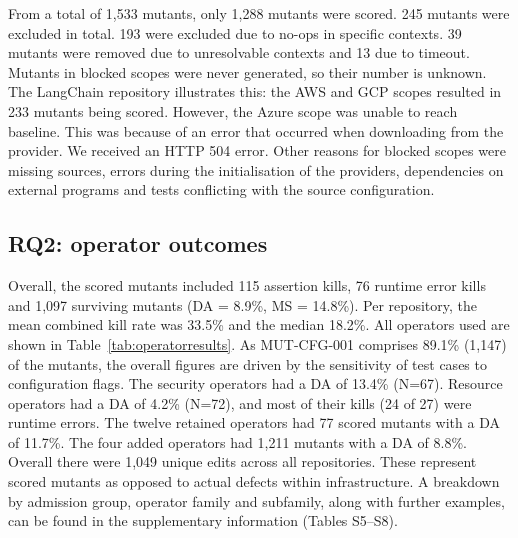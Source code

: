 \documentclass[3p,times,procedia]{elsarticle}
\begin{document}
From a total of 1,533 mutants, only 1,288 mutants were scored. 245 mutants were excluded in total. 193 were excluded due to no-ops in specific contexts. 39 mutants were removed due to unresolvable contexts and 13 due to timeout. Mutants in blocked scopes were never generated, so their number is unknown. The LangChain repository illustrates this: the AWS and GCP scopes resulted in 233 mutants being scored. However, the Azure scope was unable to reach baseline. This was because of an error that occurred when downloading from the provider. We received an HTTP 504 error. Other reasons for blocked scopes were missing sources, errors during the initialisation of the providers, dependencies on external programs and tests conflicting with the source configuration.

\subsection{RQ2: operator outcomes}\label{sec:operatorresults}
Overall, the scored mutants included 115 assertion kills, 76 runtime error kills and 1,097 surviving mutants (DA = 8.9\%, MS = 14.8\%). Per repository, the mean combined kill rate was 33.5\% and the median 18.2\%. All operators used are shown in Table~\ref{tab:operatorresults}. As MUT-CFG-001 comprises 89.1\% (1,147) of the mutants, the overall figures are driven by the sensitivity of test cases to configuration flags. The security operators had a DA of 13.4\% (N=67). Resource operators had a DA of 4.2\% (N=72), and most of their kills (24 of 27) were runtime errors. The twelve retained operators had 77 scored mutants with a DA of 11.7\%. The four added operators had 1,211 mutants with a DA of 8.8\%. Overall there were 1,049 unique edits across all repositories. These represent scored mutants as opposed to actual defects within infrastructure. A breakdown by admission group, operator family and subfamily, along with further examples, can be found in the supplementary information (Tables S5--S8).
\end{document}
